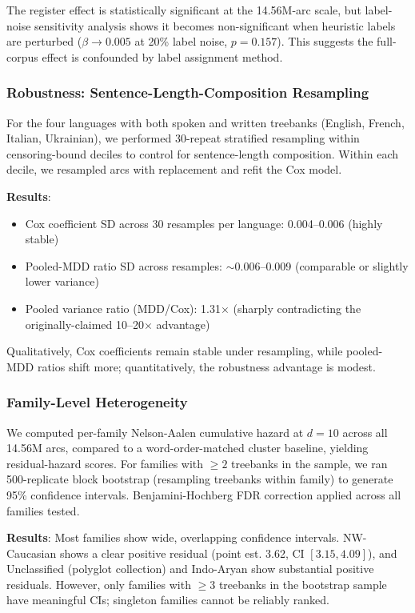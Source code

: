 \documentclass[11pt,letterpaper]{article}
\begin{document}
The register effect is statistically significant at the 14.56M-arc scale, but label-noise sensitivity analysis shows it becomes non-significant when heuristic labels are perturbed ($\beta \to 0.005$ at 20\% label noise, $p=0.157$). This suggests the full-corpus effect is confounded by label assignment method.

\subsubsection{Robustness: Sentence-Length-Composition Resampling}

For the four languages with both spoken and written treebanks (English, French, Italian, Ukrainian), we performed 30-repeat stratified resampling within censoring-bound deciles to control for sentence-length composition. Within each decile, we resampled arcs with replacement and refit the Cox model.

\textbf{Results}:
\begin{itemize}
\item Cox coefficient SD across 30 resamples per language: 0.004--0.006 (highly stable)
\item Pooled-MDD ratio SD across resamples: $\sim$0.006--0.009 (comparable or slightly lower variance)
\item Pooled variance ratio (MDD/Cox): 1.31$\times$ (sharply contradicting the originally-claimed 10--20$\times$ advantage)
\end{itemize}

Qualitatively, Cox coefficients remain stable under resampling, while pooled-MDD ratios shift more; quantitatively, the robustness advantage is modest.

\subsubsection{Family-Level Heterogeneity}

We computed per-family Nelson-Aalen cumulative hazard at $d=10$ across all 14.56M arcs, compared to a word-order-matched cluster baseline, yielding residual-hazard scores. For families with $\geq 2$ treebanks in the sample, we ran 500-replicate block bootstrap (resampling treebanks within family) to generate 95\% confidence intervals. Benjamini-Hochberg FDR correction applied across all families tested.

\textbf{Results}: Most families show wide, overlapping confidence intervals. NW-Caucasian shows a clear positive residual (point est. 3.62, CI $[3.15, 4.09]$), and Unclassified (polyglot collection) and Indo-Aryan show substantial positive residuals. However, only families with $\geq 3$ treebanks in the bootstrap sample have meaningful CIs; singleton families cannot be reliably ranked.
\end{document}
